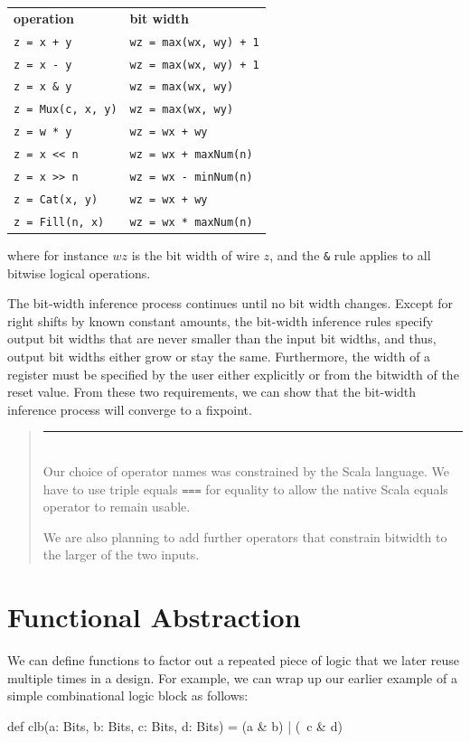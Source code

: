 \documentclass[10pt]{article}
\newenvironment{commentary}
{ \vspace{-0.1in}
  \begin{quotation}
  \noindent
  \small \em
  \rule{\linewidth}{1pt}\\
}
{
  \end{quotation}
}
\def\code#1{{\tt #1}}
\begin{document}
\begin{tabular}{ll}
{\bf operation} & {\bf bit width} \\ 
\verb|z = x + y| & \verb|wz = max(wx, wy) + 1| \\
\verb+z = x - y+ & \verb|wz = max(wx, wy) + 1|\\
\verb+z = x & y+ & \verb+wz = max(wx, wy)+ \\
\verb+z = Mux(c, x, y)+ & \verb+wz = max(wx, wy)+ \\
\verb+z = w * y+ & \verb!wz = wx + wy! \\
\verb+z = x << n+ & \verb!wz = wx + maxNum(n)! \\
\verb+z = x >> n+ & \verb+wz = wx - minNum(n)+ \\
\verb+z = Cat(x, y)+ & \verb!wz = wx + wy! \\
\verb+z = Fill(n, x)+ & \verb+wz = wx * maxNum(n)+ \\
\end{tabular}

\noindent
where for instance $wz$ is the bit width of wire $z$, and the \verb+&+
rule applies to all bitwise logical operations.

The bit-width inference process continues until no bit width changes.
Except for right shifts by known constant amounts, the bit-width
inference rules specify output bit widths that are never smaller than
the input bit widths, and thus, output bit widths either grow or stay
the same.  Furthermore, the width of a register must be specified by
the user either explicitly or from the bitwidth of the reset value.
From these two requirements, we can show that the bit-width inference
process will converge to a fixpoint.

\begin{commentary}
Our choice of operator names was constrained by the Scala language.
We have to use triple equals \code{===} for equality to allow the
native Scala equals operator to remain usable.

We are also planning to add further operators that constrain bitwidth
to the larger of the two inputs.
\end{commentary}

\section{Functional Abstraction}

We can define functions to factor out a repeated piece of logic that
we later reuse multiple times in a design.  For example, we can wrap
up our earlier example of a simple combinational logic block as
follows:
\begin{scala}
def clb(a: Bits, b: Bits, c: Bits, d: Bits) = (a & b) | (~c & d)
\end{scala}
\end{document}
